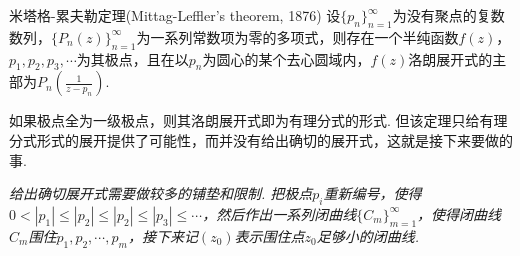 \documentclass[main.tex]{subfiles}
\begin{document}
\begin{theorem}{米塔格-累夫勒定理(Mittag-Leffler's theorem, 1876)}
    设\(\{p_n\}_{n=1}^{\infty}\)为没有聚点的复数数列，\(\{P_n(z)\}_{n=1}^{\infty}\)为一系列常数项为零的多项式，则存在一个半纯函数\(f(z)\)，\(p_1,p_2,p_3,\cdots\)为其极点，且在以\(p_n\)为圆心的某个去心圆域内，\(f(z)\)洛朗展开式的主部为\(\displaystyle{P_n\left(\frac{1}{z-p_n}\right)}\).
\end{theorem}

如果极点全为一级极点，则其洛朗展开式即为有理分式的形式. 但该定理只给有理分式形式的展开提供了可能性，而并没有给出确切的展开式，这就是接下来要做的事.

\vspace{1cm}

\textit{
给出确切展开式需要做较多的铺垫和限制. 把极点\(p_i\)重新编号，使得\(0<|p_1|\leq|p_2|\leq|p_2|\leq|p_3|\leq \cdots\)，然后作出一系列闭曲线\(\{C_m\}_{m=1}^{\infty}\)，使得闭曲线\(C_m\)围住\(p_1, p_2, \cdots, p_m\)，接下来记\((z_0)\)表示围住点\(z_0\)足够小的闭曲线.
}
\end{document}
